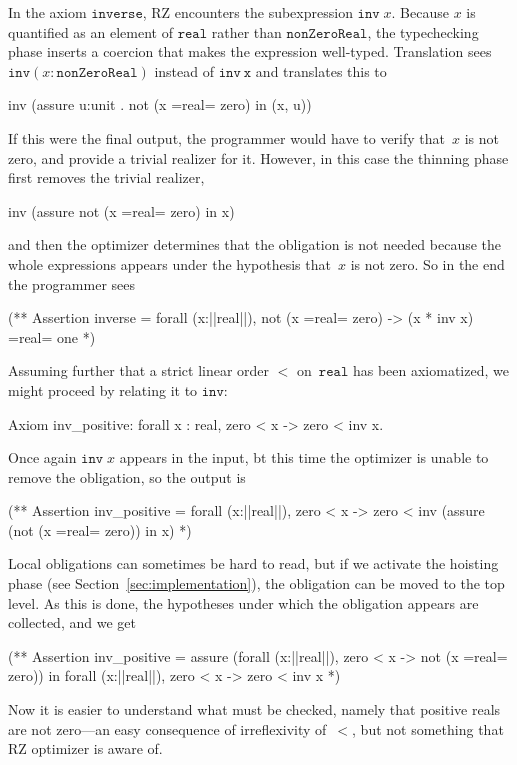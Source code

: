 In the axiom $\mathtt{inverse}$, RZ encounters the subexpression
$\mathtt{inv}\;x$. Because $x$ is quantified as an element of
$\mathtt{real}$ rather than $\mathtt{nonZeroReal}$, the typechecking
phase inserts a coercion that makes the expression well-typed.
Translation sees $\mathtt{inv}(x \mathbin{{:}}
\mathtt{nonZeroReal})$ instead of $\mathtt{inv\ x}$ and translates this to
%
\begin{source}
inv (assure u:unit . not (x =real= zero) in (x, u))
\end{source}
%
If this were the final output, the programmer would have to verify
that~$x$ is not zero, and provide a trivial realizer for it. However,
in this case the thinning phase first removes the trivial realizer,
%
\iflong
\begin{source}
inv (assure not (x =real= zero) in x)
\end{source}
\fi %
%
and then the optimizer determines that the obligation is not needed
because the whole expressions appears under the hypothesis that~$x$ is
not zero. So in the end the programmer sees
%
\begin{source}
(**  Assertion inverse =
  forall (x:||real||),  not (x =real= zero) -> (x * inv x) =real= one
*)
\end{source}
%
Assuming further that a strict linear order $<$ on~$\mathtt{real}$ has
been axiomatized, we might proceed by relating it to $\mathtt{inv}$:
%
\begin{source}
Axiom inv_positive: forall x : real, zero < x -> zero < inv x.
\end{source}
%
Once again $\mathtt{inv}\;x$ appears in the input, bt this time the
optimizer is unable to remove the obligation, so the output is
%
\begin{source}
(**  Assertion inv_positive =
       forall (x:||real||),  zero < x ->
         zero < inv (assure (not (x =real= zero)) in x)
*)
\end{source}
%
Local obligations can sometimes be hard to read, but if we activate the hoisting phase
(see Section~\ref{sec:implementation}), the obligation can be moved
to the top level. As this is done, the hypotheses under which the
obligation appears are collected, and we get
%
\begin{source}
(**  Assertion inv_positive =
  assure (forall (x:||real||),  zero < x -> not (x =real= zero))
    in forall (x:||real||),  zero < x -> zero < inv x
*)
\end{source}
%
Now it is easier to understand what must be checked, namely that
positive reals are not zero---an easy consequence of irreflexivity
of~$<$, but not something that RZ optimizer is aware of.

